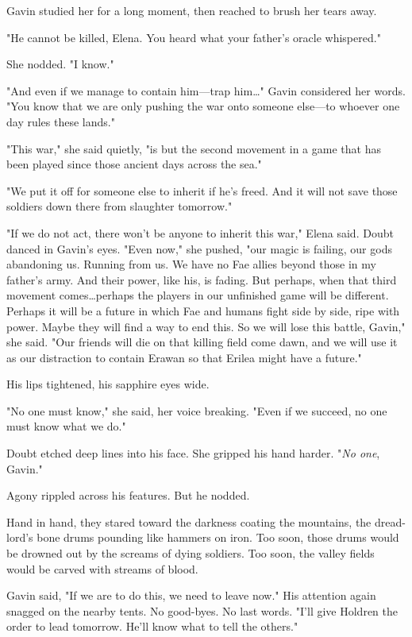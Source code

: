 Gavin studied her for a long moment, then reached to brush her tears away.

"He cannot be killed, Elena.
You heard what your father's oracle whispered."

She nodded.
"I know."

"And even if we manage to contain him---trap him\ldots" Gavin considered her words.
"You know that we are only pushing the war onto someone else---to whoever one day rules these lands."

"This war," she said quietly, "is but the second movement in a game that has been played since those ancient days across the sea."

"We put it off for someone else to inherit if he's freed.
And it will not save those soldiers down there from slaughter tomorrow."

"If we do not act, there won't be anyone to inherit this war," Elena said.
Doubt danced in Gavin's eyes.
"Even now," she pushed, "our magic is failing, our gods abandoning us.
Running from us.
We have no Fae allies beyond those in my father's army.
And their power, like his, is fading.
But perhaps, when that third movement comes\ldots perhaps the players in our unfinished game will be different.
Perhaps it will be a future in which Fae and humans fight side by side, ripe with power.
Maybe they will find a way to end this.
So we will lose this battle, Gavin," she said.
"Our friends will die on that killing field come dawn, and we will use it as our distraction to contain Erawan so that Erilea might have a future."

His lips tightened, his sapphire eyes wide.

"No one must know," she said, her voice breaking.
"Even if we succeed, no one must know what we do."

Doubt etched deep lines into his face.
She gripped his hand harder.
"\emph{No one}, Gavin."

Agony rippled across his features.
But he nodded.

Hand in hand, they stared toward the darkness coating the mountains, the dread-lord's bone drums pounding like hammers on iron.
Too soon, those drums would be drowned out by the screams of dying soldiers.
Too soon, the valley fields would be carved with streams of blood.

Gavin said, "If we are to do this, we need to leave now."
His attention again snagged on the nearby tents.
No good-byes.
No last words.
"I'll give Holdren the order to lead tomorrow.
He'll know what to tell the others."

